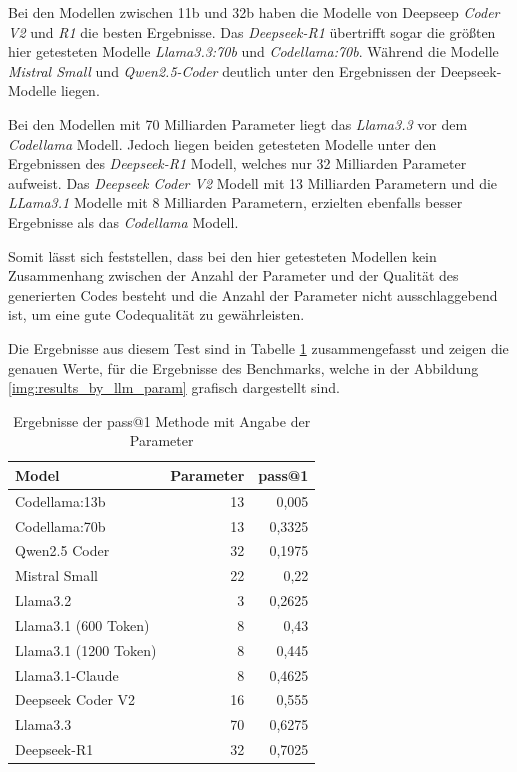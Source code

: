 Bei den Modellen zwischen 11b und 32b haben die Modelle von Deepseep \textit{Coder V2} und \textit{R1} die besten Ergebnisse. Das \textit{Deepseek-R1} übertrifft sogar die größten hier getesteten Modelle \textit{Llama3.3:70b} und \textit{Codellama:70b}. Während die Modelle \textit{Mistral Small} und \textit{Qwen2.5-Coder} deutlich unter den Ergebnissen der Deepseek-Modelle liegen.\vspace{0.2cm}

Bei den Modellen mit 70 Milliarden Parameter liegt das \textit{Llama3.3} vor dem \textit{Codellama} Modell. Jedoch liegen beiden getesteten Modelle unter den Ergebnissen des \textit{Deepseek-R1} Modell, welches nur 32 Milliarden Parameter aufweist. Das \textit{Deepseek Coder V2} Modell mit 13 Milliarden Parametern und die \textit{LLama3.1} Modelle mit 8 Milliarden Parametern, erzielten ebenfalls besser Ergebnisse als das \textit{Codellama} Modell.\vspace{0.2cm}

Somit lässt sich feststellen, dass bei den hier getesteten Modellen kein Zusammenhang zwischen der Anzahl der Parameter und der Qualität des generierten Codes besteht und die Anzahl der Parameter nicht ausschlaggebend ist, um eine gute Codequalität zu gewährleisten.\vspace{0.2cm}

Die Ergebnisse aus diesem Test sind in Tabelle \ref{tab:prompt_results_open_models_by_param} zusammengefasst und zeigen die genauen Werte, für die Ergebnisse des Benchmarks, welche in der Abbildung \ref{img:results_by_llm_param} grafisch dargestellt sind.

\begin{table}[!ht]
	\begin{tabular}{|l|r|r|}
		\hline
		\textbf{Model} & \textbf{Parameter} & \textbf{pass@1} \\
		\hline
		Codellama:13b         & 13 &  0,005 \\
		Codellama:70b         & 13 & 0,3325 \\
		Qwen2.5 Coder         & 32 & 0,1975 \\
		Mistral Small         & 22 &   0,22 \\
		Llama3.2              &  3 & 0,2625 \\
		Llama3.1 (600 Token)  &  8 &   0,43 \\
		Llama3.1 (1200 Token) &  8 &  0,445 \\
		Llama3.1-Claude       &  8 & 0,4625 \\
		Deepseek Coder V2     & 16 &  0,555 \\
		Llama3.3              & 70 & 0,6275 \\
		Deepseek-R1           & 32 & 0,7025 \\
		\hline
		\hline
	\end{tabular}
	\centering
	\label{tab:prompt_results_open_models_by_param}
	\caption{Ergebnisse der pass@1 Methode mit Angabe der Parameter}
\end{table}


